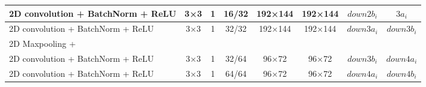 \begin{table}[htbp]
\begin{adjustbox}{width=1\textwidth}
\begin{tabular}{|l|c|c|c|c|c|c|c|}
\hspace{0.75cm}2D convolution + BatchNorm + ReLU                           & 3×3             & 1               & 16/32            & 192×144         & 192×144         & $down2b_i$           & $3a_i$          \\ \hline
\hspace{0.75cm}2D convolution + BatchNorm + ReLU                           & 3×3             & 1               & 32/32            & 192×144         & 192×144         & $down3a_i$           & $down3b_i$          \\ \hline
\hspace{0.75cm}2D Maxpooling +               &                 &                 &                 &                 &                 &                    &                 \\ 
\hspace{0.75cm}2D convolution + BatchNorm + ReLU                           & 3×3             & 1               & 32/64            & 96×72         & 96×72         & $down3b_i$           & $down4a_i$          \\ \hline
\hspace{0.75cm}2D convolution + BatchNorm + ReLU                           & 3×3             & 1               & 64/64            & 96×72         & 96×72         & $down4a_i$           & $down4b_i$          \\ \hline


\end{tabular}
\end{adjustbox}
\end{table}

